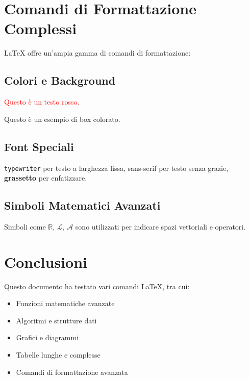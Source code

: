 \documentclass[12pt]{article}
\begin{document}
\section{Comandi di Formattazione Complessi}
LaTeX offre un'ampia gamma di comandi di formattazione:

\subsection{Colori e Background}
\textcolor{red}{Questo è un testo rosso.}
\begin{tcolorbox}[colframe=blue, colback=yellow!10!white]
Questo è un esempio di box colorato.
\end{tcolorbox}

\subsection{Font Speciali}
\texttt{typewriter} per testo a larghezza fissa, \textsf{sans-serif} per testo senza grazie, \textbf{grassetto} per enfatizzare.

\subsection{Simboli Matematici Avanzati}
Simboli come \(\mathbb{R}\), \(\mathscr{L}\), \(\mathcal{A}\) sono utilizzati per indicare spazi vettoriali e operatori.

\section{Conclusioni}
Questo documento ha testato vari comandi LaTeX, tra cui:
\begin{itemize}
    \item Funzioni matematiche avanzate
    \item Algoritmi e strutture dati
    \item Grafici e diagrammi
    \item Tabelle lunghe e complesse
    \item Comandi di formattazione avanzata
\end{itemize}
\end{document}
